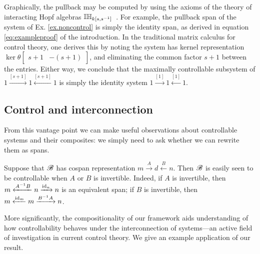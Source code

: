 Graphically, the pullback may be computed by using the axioms of the theory of
interacting Hopf algebras $\mathbb{IH}_{k[s,s^{-1}]}$~\cite{BSZ2,Za}. For example, the pullback
span of the system of Ex. \ref{ex.noncontrol} is simply the identity span, as
derived in equation \eqref{eq:exampleproof} of the introduction. In the
traditional matrix calculus for control theory, one derives this by noting the
system has kernel representation $\ker\theta\begin{bmatrix} s+1 & -(s+1)
\end{bmatrix}$, and eliminating the common factor $s+1$ between the entries.
Either way, we conclude that the maximally controllable subsystem of $1
\xrightarrow{[s+1]} 1 \xleftarrow{[s+1]} 1$ is simply the identity system $1
\xrightarrow{[1]} 1 \xleftarrow{[1]} 1$.


\subsection{Control and interconnection}
From this vantage point we can make useful observations about controllable
systems and their composites: we simply need to ask whether we can rewrite them
as spans. 

\begin{example}
  Suppose that ${\mathscr B}$ has cospan representation
    $m \xrightarrow{A} d \xleftarrow{B} n.$
  Then ${\mathscr B}$ is easily seen to be controllable when $A$ or $B$ is invertible.
  Indeed, if $A$ is invertible, then $m  \xleftarrow{A^{-1}B} n
  \xrightarrow{\mathrm{id}_n} n$ is an equivalent span; if $B$ is invertible, then
  $m\xleftarrow{\mathrm{id}_m} m \xrightarrow{B^{-1}A} n$.
\end{example}

More significantly, the compositionality of our framework aids understanding of
how controllability behaves under the interconnection of systems---an active
field of investigation in current control theory. We give an example application
of our result.

